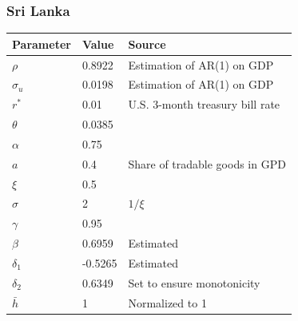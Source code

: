 \documentclass[mathserif]{beamer}
\begin{document}
    \begin{frame}
        \frametitle{Sri Lanka}
        \centering
        \begin{tabular}{@{}lll@{}}
        \toprule
        Parameter  & Value  & Source                                                                         \\
        \midrule
        $\rho$     & 0.8922  & Estimation of AR(1) on GDP\\
        $\sigma_u$ & 0.0198 & Estimation of AR(1) on GDP \\
        $r^*$      & 0.01 & U.S. 3-month treasury bill rate \\
        $\theta$   & 0.0385 & \citet*{Chatterjee-12}                                              \\
        $\alpha$   & 0.75   & \citet{Jegajeevan-Sri-Lanka-DSGE}                                                       \\
        $a$        & 0.4   & Share of tradable goods in GPD                  \\
        $\xi$      & 0.5   & \citet{Na-18}                             \\
        $\sigma$   & 2   & $1 / \xi$                                                                      \\
        $\gamma$   & 0.95   & \citet*{wage-rigidity-data}                  \\
        $\beta$    & 0.6959  &  Estimated                                                                              \\
        $\delta_1$ &  -0.5265 &   Estimated                                                                             \\
        $\delta_2$ &  0.6349   &   Set to ensure monotonicity                                                                 \\
        $\bar{h}$  & 1      & Normalized to 1\\
        \bottomrule
        \end{tabular}%

    \end{frame}
\end{document}
